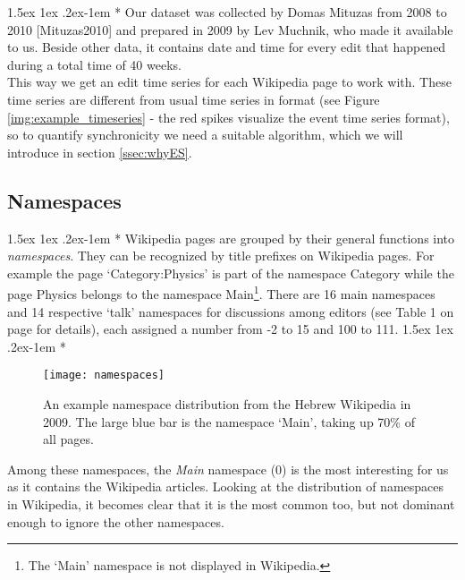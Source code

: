 \documentclass[a4paper,12pt,twoside]{article}
\makeatletter
\renewcommand{\paragraph}{%
  \@startsection{paragraph}{4}%
  {\z@}{1.5ex \@plus 1ex \@minus .2ex}{-1em}%
  {\normalfont\normalsize\bfseries}%
}
\makeatother
\begin{document}
\paragraph*{} Our dataset was collected by Domas Mituzas from 2008 to 2010 [{\sc Mituzas}2010] and prepared in 2009 by Lev Muchnik, who made it available to us. Beside other data, it contains date and time for every edit that happened during a total time of 40 weeks.\\
This way we get an edit time series for each Wikipedia page to work with. These time series are different from usual time series in format (see Figure \ref{img:example_timeseries} - the red spikes visualize the event time series format), so to quantify synchronicity we need a suitable algorithm, which we will introduce in section \ref{ssec:whyES}.
\subsection{Namespaces}
\label{ssec:namespaces}
\paragraph*{} Wikipedia pages are grouped by their general functions into \emph{namespaces}. They can be recognized by title prefixes on Wikipedia pages. For example the page `{\sf Category:Physics}' is part of the namespace {\sf Category} while the page {\sf Physics} belongs to the namespace {\sf Main}\footnote{The `Main' namespace is not displayed in Wikipedia.}. There are 16 main namespaces and 14 respective `talk' namespaces for discussions among editors (see Table 1 on page \pageref{tbl:namespaces} for details), each assigned a number from -2 to 15 and 100 to 111.
\paragraph*{}
\begin{wrapfigure}{r}{7.5cm}
\centering
\texttt{[image: namespaces]}
\caption{An example namespace distribution from the Hebrew Wikipedia in 2009. The large blue bar is the namespace `Main', taking up 70\% of all pages.}
\vspace{-2cm}
\label{img:namespaces}
\end{wrapfigure}
Among these namespaces, the \emph{Main} namespace (0) is the most interesting for us as it contains the Wikipedia articles. Looking at the distribution of namespaces in Wikipedia, it becomes clear that it is the most common too, but not dominant enough to ignore the other namespaces.
\end{document}
